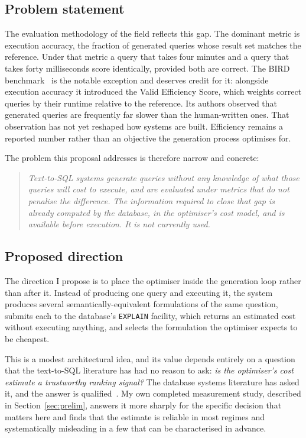 \documentclass[12pt, a4paper]{article}
\begin{document}
\subsection{Problem statement}
\label{sec:problem}

The evaluation methodology of the field reflects this gap. The dominant
metric is execution accuracy, the fraction of generated queries whose
result set matches the reference. Under that metric a query that takes
four minutes and a query that takes forty milliseconds score
identically, provided both are correct. The BIRD
benchmark~\cite{li2023bird} is the notable exception and deserves
credit for it: alongside execution accuracy it introduced the Valid
Efficiency Score, which weights correct queries by their runtime
relative to the reference. Its authors observed that generated queries
are frequently far slower than the human-written ones. That observation
has not yet reshaped how systems are built. Efficiency remains a
reported number rather than an objective the generation process
optimises for.

The problem this proposal addresses is therefore narrow and concrete:

\begin{quote}
\emph{Text-to-SQL systems generate queries without any knowledge of what
those queries will cost to execute, and are evaluated under metrics that
do not penalise the difference. The information required to close that
gap is already computed by the database, in the optimiser's cost model,
and is available before execution. It is not currently used.}
\end{quote}

\subsection{Proposed direction}

The direction I propose is to place the optimiser inside the generation
loop rather than after it. Instead of producing one query and executing
it, the system produces several semantically-equivalent formulations of
the same question, submits each to the database's \texttt{EXPLAIN}
facility, which returns an estimated cost without executing anything,
and selects the formulation the optimiser expects to be cheapest.

This is a modest architectural idea, and its value depends entirely on a
question that the text-to-SQL literature has had no reason to ask:
\emph{is the optimiser's cost estimate a trustworthy ranking signal?}
The database systems literature has asked it, and the answer is
qualified~\cite{leis2015good, wu2013predicting}. My own completed
measurement study, described in Section~\ref{sec:prelim}, answers it
more sharply for the specific decision that matters here and finds that
the estimate is reliable in most regimes and systematically misleading
in a few that can be characterised in advance.
\end{document}
